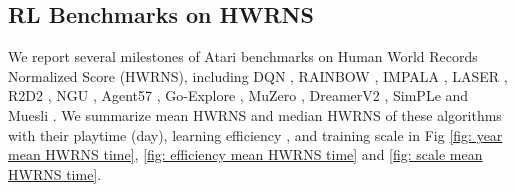 \documentclass[nohyperref]{article}
\theoremstyle{plain}
\begin{document}
\begin{figure*}[!t]
    \centering
	\centering
	\caption{SOTA algorithms of Atari 57 games on mean and median HNS (\%) and corresponding training scale.}
	\label{fig: scale mean HNS time}
\end{figure*}



\subsection{RL Benchmarks on HWRNS}
\label{app: RL Benchmarks on HWRNS}


We report several milestones of Atari benchmarks on Human World Records Normalized Score (HWRNS), including DQN \citep{dqn}, RAINBOW \citep{rainbow}, IMPALA \citep{impala}, LASER \citep{laser}, R2D2 \citep{r2d2}, NGU \citep{ngu}, Agent57 \citep{agent57}, Go-Explore \citep{goexplore}, MuZero \citep{muzero}, DreamerV2 \citep{dreamerv2}, SimPLe \citep{modelbasedatari} and Muesli \citep{muesli}. We summarize mean HWRNS and median HWRNS of these algorithms  with their playtime (day), learning efficiency , and training scale in Fig \ref{fig: year mean HWRNS time}, \ref{fig: efficiency mean HWRNS time} and \ref{fig: scale mean HWRNS time}.

\begin{figure*}[!t]
    \centering
	\centering
	\caption{SOTA algorithms of Atari 57 games on mean and median HWRNS (\%) and corresponding playtime.}
	\label{fig: year mean HWRNS time}
\end{figure*}

\begin{figure*}[!t]
    \centering
	\centering
	\caption{SOTA algorithms of Atari 57 games on mean and median HWRNS (\%) and corresponding learning efficiency calculated by $\frac{\text{MEAN HWRNS/MEDIAN HWRNS}}{\text{TRAINING FRAMES}}$.}
	\label{fig: efficiency mean HWRNS time}
\end{figure*}
\end{document}
